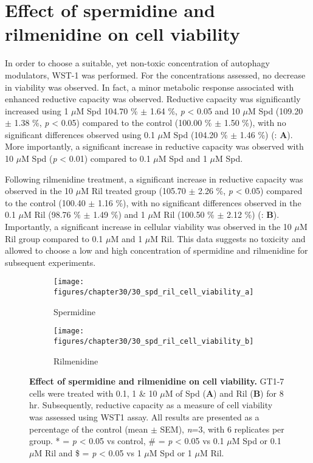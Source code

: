 {\section{Effect of spermidine and rilmenidine on cell viability}
In order to choose a suitable, yet non-toxic concentration of autophagy modulators, WST-1 was performed. For the concentrations assessed, no decrease in viability was observed. In fact, a minor metabolic response associated with enhanced reductive capacity was observed. Reductive capacity was significantly increased using 1 $\mu$M Spd 104.70 \% $\pm$ 1.64 \%, \textit{p} < 0.05 and 10 $\mu$M Spd (109.20 $\pm$ 1.38 \%, \textit{p} < 0.05) compared to the control (100.00 \% $\pm$ 1.50 \%), with no significant differences observed using 0.1 $\mu$M Spd (104.20 \% $\pm$ 1.46 \%) (: \textbf{A}). More importantly, a significant increase in reductive capacity was observed with 10 $\mu$M Spd (\textit{p} < 0.01) compared to 0.1 $\mu$M Spd and 1 $\mu$M Spd.

Following rilmenidine treatment, a significant increase in reductive capacity was observed in the 10 $\mu$M Ril treated group (105.70 $\pm$ 2.26 \%, \textit{p} < 0.05) compared to the control (100.40 $\pm$ 1.16 \%), with no significant differences observed in the 0.1 $\mu$M Ril (98.76 \% $\pm$ 1.49 \%) and 1 $\mu$M Ril (100.50 \% $\pm$ 2.12 \%) (: \textbf{B}). Importantly, a significant increase in cellular viability was observed in the 10 $\mu$M Ril group compared to 0.1 $\mu$M and 1 $\mu$M Ril. This data suggests no toxicity and allowed to choose a low and high concentration of spermidine and rilmenidine for subsequent experiments.

\begin{figure}[!htbp]
  \centering
  \begin{subfigure}[b]{0.495\linewidth}
    \texttt{[image: figures/chapter30/30\_spd\_ril\_cell\_viability\_a]}
    \caption{Spermidine}
  \end{subfigure}
  \begin{subfigure}[b]{0.495\linewidth}
    \texttt{[image: figures/chapter30/30\_spd\_ril\_cell\_viability\_b]}
    \caption{Rilmenidine}
  \end{subfigure}
  \caption[Effect of spermidine and rilmenidine on cell viability]{\textbf{Effect of spermidine and rilmenidine on cell viability.} GT1-7 cells were treated with 0.1, 1 \& 10 $\mu$M of Spd (\textbf{A}) and Ril (\textbf{B}) for 8 hr. Subsequently, reductive capacity as a measure of cell viability was assessed using WST1 assay. All results are presented as a percentage of the control (mean $\pm$ SEM), \textit{n}=3, with 6 replicates per group. * = \textit{p} < 0.05 vs control, \# = \textit{p} < 0.05 vs 0.1 $\mu$M Spd or 0.1 $\mu$M Ril and \$ = \textit{p} < 0.05 vs 1 $\mu$M Spd or 1 $\mu$M Ril.}
  \label{fig:30_spd_ril_cell_viability_a}
\end{figure}

}
